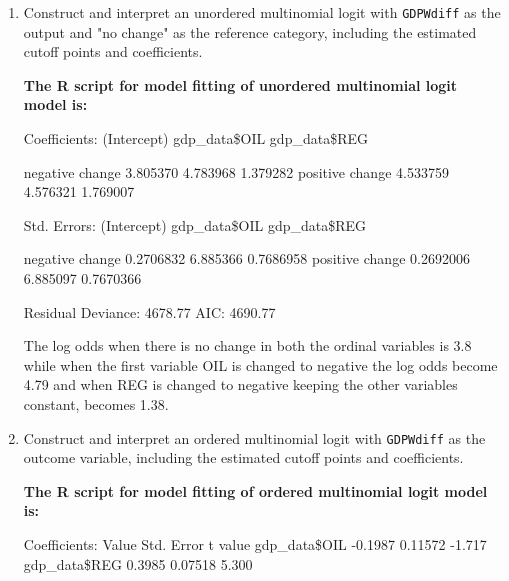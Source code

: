 \documentclass[12pt,letterpaper]{article}
\begin{document}
\begin{enumerate}
	\item Construct and interpret an unordered multinomial logit with \texttt{GDPWdiff} as the output and "no change" as the reference category, including the estimated cutoff points and coefficients.
	
	\textbf{		The R script for model fitting of unordered multinomial logit model is:}
		 
	
	\vspace{.8cm}
	
		
		Coefficients:  \newline
				(Intercept)     				            gdp\_data\$OIL                   gdp\_data\$REG
		
		negative change                       3.805370     4.783968     1.379282 \newline
		positive change    					4.533759     4.576321     1.769007 \newline
		
		Std. Errors: \newline                
		(Intercept)                                    gdp\_data\$OIL             gdp\_data\$REG
		
		negative change             0.2706832     6.885366    0.7686958 \newline
		positive change              0.2692006     6.885097    0.7670366 \newline
		
		Residual Deviance: 4678.77 \newline
		AIC: 4690.77 
		
		The log odds when there is no change in both the ordinal variables is 3.8 while when the first variable OIL is changed to negative the log odds become 4.79 and when REG is changed to negative keeping the other variables constant, becomes 1.38.
\newpage	
	\item Construct and interpret an ordered multinomial logit with \texttt{GDPWdiff} as the outcome variable, including the estimated cutoff points and coefficients.
	
	\textbf{		The R script for model fitting of ordered multinomial logit model is:}
	
	
	Coefficients: \newline              
	Value 					Std. Error 						t value \newline
	gdp\_data\$OIL -0.1987    0.11572  -1.717 \newline
	gdp\_data\$REG  0.3985    0.07518   5.300\newline
	

\end{enumerate}
\end{document}

